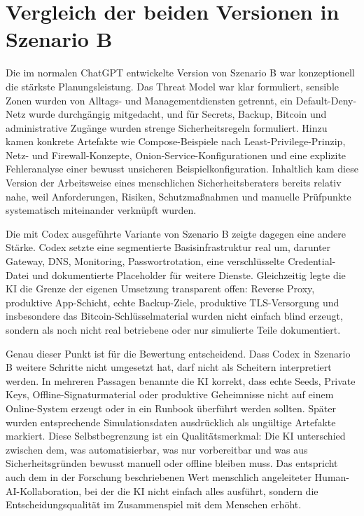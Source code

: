 \section{Vergleich der beiden Versionen in Szenario B}

Die im normalen ChatGPT entwickelte Version von Szenario B war konzeptionell die stärkste Planungsleistung. Das Threat Model war klar formuliert, sensible Zonen wurden von Alltags- und Managementdiensten getrennt, ein  Default-Deny-Netz wurde durchgängig mitgedacht, und für Secrets, Backup, Bitcoin und administrative Zugänge wurden strenge Sicherheitsregeln formuliert. Hinzu kamen konkrete Artefakte wie Compose-Beispiele nach Least-Privilege-Prinzip, Netz- und Firewall-Konzepte, Onion-Service-Konfigurationen und eine explizite Fehleranalyse einer bewusst unsicheren Beispielkonfiguration. Inhaltlich kam diese Version der Arbeitsweise eines menschlichen Sicherheitsberaters bereits relativ nahe, weil Anforderungen, Risiken, Schutzmaßnahmen und manuelle Prüfpunkte systematisch miteinander verknüpft wurden.

Die mit Codex ausgeführte Variante von Szenario B zeigte dagegen eine andere Stärke. Codex setzte eine segmentierte Basisinfrastruktur real um, darunter Gateway, DNS, Monitoring, Passwortrotation, eine verschlüsselte Credential-Datei und dokumentierte Placeholder für weitere Dienste. Gleichzeitig legte die \acs{KI} die Grenze der eigenen Umsetzung transparent offen: Reverse Proxy, produktive App-Schicht, echte Backup-Ziele, produktive TLS-Versorgung und insbesondere das Bitcoin-Schlüsselmaterial wurden nicht einfach blind erzeugt, sondern als noch nicht real betriebene oder nur simulierte Teile dokumentiert.

Genau dieser Punkt ist für die Bewertung entscheidend. Dass Codex in Szenario B weitere Schritte nicht umgesetzt hat, darf nicht als Scheitern interpretiert werden. In mehreren Passagen benannte die \acs{KI} korrekt, dass echte Seeds, Private Keys, Offline-Signaturmaterial oder produktive Geheimnisse nicht auf einem Online-System erzeugt oder in ein Runbook überführt werden sollten. Später wurden entsprechende Simulationsdaten ausdrücklich als ungültige Artefakte markiert. Diese Selbstbegrenzung ist ein Qualitätsmerkmal: Die \acs{KI} unterschied zwischen dem, was automatisierbar, was nur vorbereitbar und was aus Sicherheitsgründen bewusst manuell oder offline bleiben muss. Das entspricht auch dem in der Forschung beschriebenen Wert menschlich angeleiteter Human-AI-Kollaboration, bei der die \acs{KI} nicht einfach alles ausführt, sondern die Entscheidungsqualität im Zusammenspiel mit dem Menschen erhöht.\cite{tariq2025bridgingexpertise}

